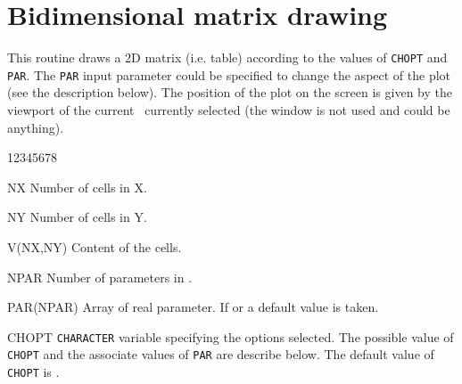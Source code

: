 \section{Bidimensional matrix drawing}
\Action
This routine draws a 2D matrix (i.e. table) according to the values of
{\tt CHOPT} and {\tt PAR}. The {\tt PAR} input parameter could be specified 
to change the aspect of the plot (see the description below). The position of
the plot on the screen is given by the viewport of the current \NT~currently
selected (the window is not used and could be anything).
\Pdesc
\begin{DLtt}{12345678}
\item[NX]        Number of cells in X.
\item[NY]        Number of cells in Y.
\item[V(NX,NY)]  Content of the cells.
\item[NPAR]      Number of parameters in .
\item[PAR(NPAR)] Array of real parameter. If  or  a
                 default value is taken.
\item[CHOPT] {\tt CHARACTER} variable specifying the options selected. The
possible value of {\tt CHOPT} and the associate values of {\tt PAR} are
describe below. The default value of {\tt CHOPT} is .
\end{DLtt}

